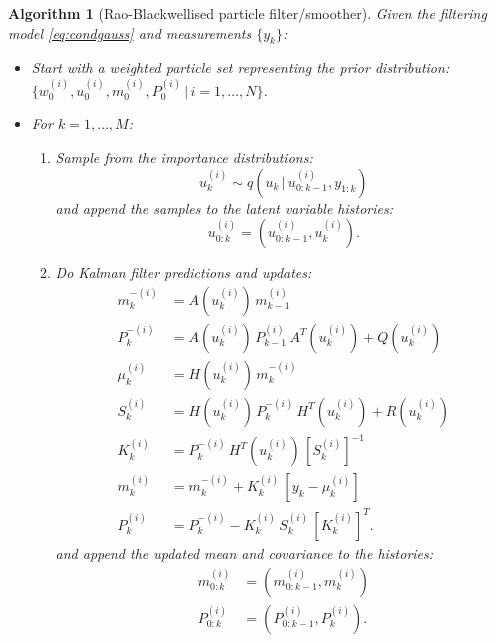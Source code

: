 \documentclass[twocolumn]{autart}    %
\newtheorem{algo}{Algorithm}[section]
\begin{document}
\begin{algo}[Rao-Blackwellised particle filter/smoother] \label{eq:rbpfs}
  Given the filtering model \eqref{eq:condgauss} and
  measurements $\{y_k\}$:
\begin{itemize}
\item Start with a weighted particle set representing the prior
  distribution: $\{ w_0^{(i)}, u_0^{(i)}, m_0^{(i)}, P_0^{(i)} \,|\,i=1,\ldots,N \}$.
\item For $k=1,\ldots,M$:
\begin{enumerate}
\item Sample from the importance distributions:
  \begin{equation}
     u_k^{(i)} \sim q(u_{k} \, | \, u_{0:k-1}^{(i)},y_{1:k})
  \end{equation}
%
  and append the samples to the latent variable histories:
%
  \begin{equation}
     u_{0:k}^{(i)} = (u_{0:k-1}^{(i)},u_k^{(i)}).
  \end{equation}

\item Do Kalman filter predictions and updates:
%
  \begin{equation}
  \begin{split}
    m_k^{-(i)} &= A(u_{k}^{(i)}) \, m_{k-1}^{(i)} \\
    P_k^{-(i)} &= A(u_{k}^{(i)}) \, P_{k-1}^{(i)} \, A^T(u_{k}^{(i)})
                + Q(u_{k}^{(i)}) \\
   \mu_k^{(i)} &= H(u_{k}^{(i)}) \, m_k^{-(i)} \\
     S_k^{(i)} &= H(u_{k}^{(i)}) \, P_{k}^{-(i)} \, H^T(u_{k}^{(i)})
                + R(u_{k}^{(i)}) \\
     K_k^{(i)} &= P_{k}^{-(i)} \, H^T(u_{k}^{(i)}) \, [S_k^{(i)}]^{-1} \\
     m_k^{(i)} &= m_k^{-(i)} + K_k^{(i)} \, [y_k - \mu_k^{(i)}] \\
     P_k^{(i)} &= P_{k}^{-(i)} - K_k^{(i)} \, S_k^{(i)} \, [K_k^{(i)}]^T.
  \end{split}
  \end{equation}
%
  and append the updated mean and covariance to the histories:
%
  \begin{equation}
  \begin{split}
     m_{0:k}^{(i)} &= (m_{0:k-1}^{(i)},m_k^{(i)}) \\
     P_{0:k}^{(i)} &= (P_{0:k-1}^{(i)},P_k^{(i)}).
  \end{split}
  \end{equation}


\end{enumerate}
\end{itemize}
\end{algo}
\end{document}
